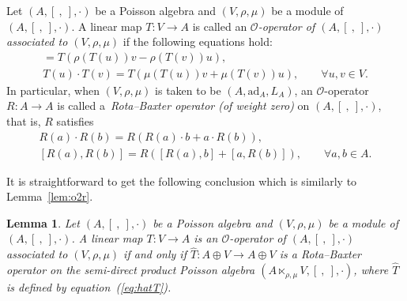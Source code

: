 \documentclass[pdftex]{sigma}
\numberwithin{equation}{section}
\newtheorem{Lemma}[Theorem]{Lemma}
\newcommand{\ad}{\mathrm{ad}}
\begin{document}
\begin{Definition}
 Let $(A, [\ ,\ ], \cdot)$ be a Poisson algebra and $(V, \rho, \mu)$ be a module of $(A, [\ ,\ ], \cdot)$.
 A linear map $T\colon V \to A$ is called an \textit{$\mathcal{O}$-operator of $(A, [\ ,\ ], \cdot)$ associated to $(V, \rho, \mu)$} if the following equations hold:
 \begin{gather*}
 [T(u), T(v)] = T(\rho(T(u))v - \rho(T(v))u),\\ %
 T(u) \cdot T(v) = T(\mu(T(u))v+ \mu(T(v))u), \qquad
 \forall u, v \in V. %
 \end{gather*}
	In particular, when $(V, \rho, \mu)$ is taken to be $(A, \ad_A, L_A)$, an $\mathcal O$-operator $R\colon A \to A$ is called a~\textit{Rota--Baxter operator (of weight zero)} on $(A, [\ ,\ ], \cdot)$, that is, $R$ satisfies
	\begin{gather*}
 	 R(a) \cdot R(b) = R(R(a) \cdot b + a \cdot R(b)),\\
 [R(a), R(b)] = R([R(a), b] + [a, R(b)]), \qquad \forall a, b \in A.
	\end{gather*}
\end{Definition}

It is straightforward to get the following conclusion which is similarly to Lemma~\ref{lem:o2r}.

\begin{Lemma}\label{lem:o2rp}
 Let $(A, [\ ,\ ], \cdot)$ be a Poisson algebra and $(V, \rho, \mu)$ be a module of $(A, [\ ,\ ], \cdot)$.
 A linear map $T\colon V \to A$ is an $\mathcal{O}$-operator of $(A, [\ ,\ ], \cdot)$ associated to $(V, \rho, \mu)$ if and only if $\hat T\colon A \oplus V \to A \oplus V$ is a Rota--Baxter operator on the semi-direct product Poisson algebra $(A \ltimes_{\rho, \mu} V, [\ ,\ ], \cdot)$, where $\hat T$ is defined by equation~{\rm (\ref{eq:hatT})}.
\end{Lemma}
\end{document}
